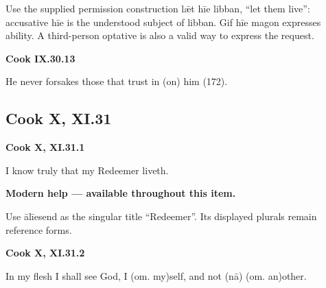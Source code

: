 Use the supplied permission construction lǣt hīe libban, “let them live”: accusative hīe is the understood subject of libban. Gif hīe magon expresses ability. A third-person optative is also a valid way to express the request.

\par\begin{minipage}{\linewidth}\raggedright
\textbf{Cook IX.30.13}

He never forsakes those that trust in (on) him (172).

\end{minipage}\par\addvspace{4pt}

\subsection*{Cook X, XI.31}

\par\begin{minipage}{\linewidth}\raggedright
\textbf{Cook X, XI.31.1}

I know truly that my Redeemer liveth.

\textbf{Modern help — available throughout this item.}

\end{minipage}\par\addvspace{4pt}

Use ālīesend as the singular title “Redeemer”. Its displayed plurals remain reference forms.

\par\begin{minipage}{\linewidth}\raggedright
\textbf{Cook X, XI.31.2}

In my flesh I shall see God, I (om. my)self, and not (nā) (om. an)other.

\end{minipage}\par\addvspace{4pt}

